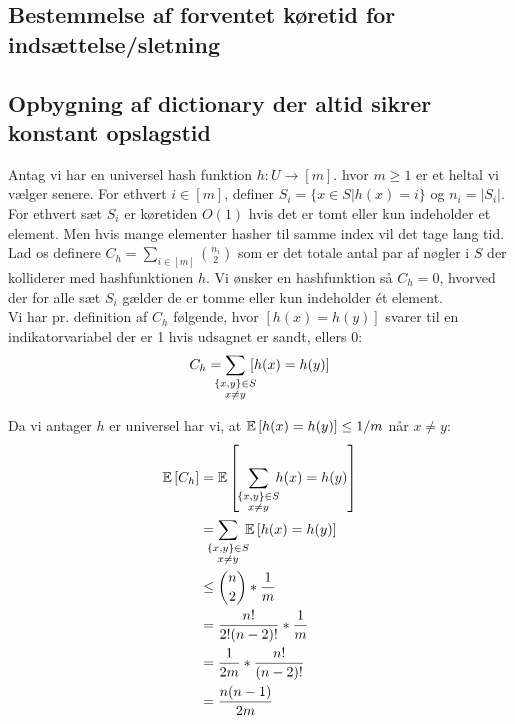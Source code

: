 \subsection{Bestemmelse af forventet køretid for indsættelse/sletning}



\subsection{Opbygning af dictionary der altid sikrer konstant opslagstid}
Antag vi har en universel hash funktion $h : U \rightarrow [m]$. hvor $m \geq 1$ er et heltal vi vælger senere. For ethvert $i \in [m]$, definer $S_i = \{ x \in S | h(x) = i \}$ og $n_i = |S_i|$. For ethvert sæt $S_i$ er køretiden $O(1)$ hvis det er tomt eller kun indeholder et element. Men hvis mange elementer hasher til samme index vil det tage lang tid.\\

Lad os definere $C_h = \sum_{i \in [m]} \binom{n_i}{2}$ som er det totale antal par af nøgler i $S$ der kolliderer med hashfunktionen $h$. Vi ønsker en hashfunktion så $C_h = 0$, hvorved der for alle sæt $S_i$ gælder de er tomme eller kun indeholder ét element.\\

Vi har pr. definition af $C_h$ følgende, hvor $[h(x) = h(y)]$ svarer til en indikatorvariabel der er 1 hvis udsagnet er sandt, ellers 0:
\begin{align}
  C_h = \sum_{\mathclap{\substack{ \{x, y\} \in S\\ x \neq y}}} \ [h(x) = h(y)]
\end{align}

Da vi antager $h$ er universel har vi, at $\mathbb{E} \left[  h(x) = h(y)  \right] \leq 1/m$ når $x \neq y$:
\begin{align}
  \E{C_h}
  &= \E{ \ \ \sum_{\mathclap{\substack{ \{x, y\} \in S\\ x \neq y}}} \ h(x) = h(y)} \nonumber \\
  &= \sum_{\mathclap{\substack{ \{x, y\} \in S\\ x \neq y}}} \ \E{h(x) = h(y)} \label{eq:lin-of-expp} \\
  &\leq \binom{n}{2} * \frac{1}{m} \label{eq:n-choose-2} \\
  &= \frac{n!}{2!(n-2)!} * \frac{1}{m} \nonumber \\
  &= \frac{1}{2m} * \frac{n!}{(n-2)!} \nonumber \\
  &= \frac{n(n-1)}{2m} \label{eq:binom-to-frac}
\end{align}

